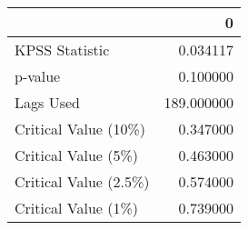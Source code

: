 \begin{tabular}{lr}
\toprule
{} &           0 \\
\midrule
KPSS Statistic        &    0.034117 \\
p-value               &    0.100000 \\
Lags Used             &  189.000000 \\
Critical Value (10\%)  &    0.347000 \\
Critical Value (5\%)   &    0.463000 \\
Critical Value (2.5\%) &    0.574000 \\
Critical Value (1\%)   &    0.739000 \\
\bottomrule
\end{tabular}
